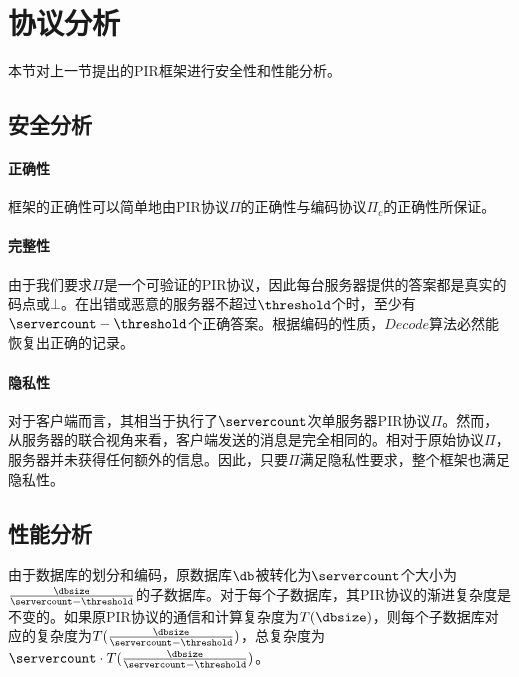 \section{协议分析}
本节对上一节提出的PIR框架进行安全性和性能分析。

\subsection{安全分析}
\paragraph{正确性}
框架的正确性可以简单地由PIR协议$\Pi$的正确性与编码协议$\Pi_c$的正确性所保证。

\paragraph{完整性}
由于我们要求$\Pi$是一个可验证的PIR协议，因此每台服务器提供的答案都是真实的码点或$\bot$。在出错或恶意的服务器不超过$\threshold$个时，至少有$\servercount-\threshold$个正确答案。根据编码的性质，$Decode$算法必然能恢复出正确的记录。

\paragraph{隐私性}
对于客户端而言，其相当于执行了$\servercount$次单服务器PIR协议$\Pi$。然而，从服务器的联合视角来看，客户端发送的消息是完全相同的。相对于原始协议$\Pi$，服务器并未获得任何额外的信息。因此，只要$\Pi$满足隐私性要求，整个框架也满足隐私性。

\subsection{性能分析}
由于数据库的划分和编码，原数据库$\db$被转化为$\servercount$个大小为$\frac{\dbsize}{\servercount-\threshold}$的子数据库。对于每个子数据库，其PIR协议的渐进复杂度是不变的。如果原PIR协议的通信和计算复杂度为$T(\dbsize)$，则每个子数据库对应的复杂度为$T(\frac{\dbsize}{\servercount-\threshold})$，总复杂度为$\servercount \cdot T(\frac{\dbsize}{\servercount-\threshold})$。